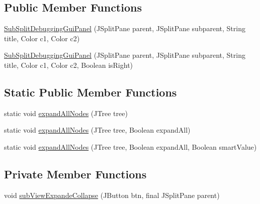 \subsection*{Public Member Functions}
\begin{DoxyCompactItemize}
\item 
\hyperlink{classit_1_1emarolab_1_1cagg_1_1debugging_1_1baseComponents_1_1customPanel_1_1SubSplitDebuggingGuiPanel_adb34980b945f0e1a777218be8d4c1d0a}{Sub\-Split\-Debugging\-Gui\-Panel} (J\-Split\-Pane parent, J\-Split\-Pane subparent, String title, Color c1, Color c2)
\item 
\hyperlink{classit_1_1emarolab_1_1cagg_1_1debugging_1_1baseComponents_1_1customPanel_1_1SubSplitDebuggingGuiPanel_a4933fbfc4f67f3e7fbb98c654fccbf55}{Sub\-Split\-Debugging\-Gui\-Panel} (J\-Split\-Pane parent, J\-Split\-Pane subparent, String title, Color c1, Color c2, Boolean is\-Right)
\end{DoxyCompactItemize}
\subsection*{Static Public Member Functions}
\begin{DoxyCompactItemize}
\item 
static void \hyperlink{classit_1_1emarolab_1_1cagg_1_1debugging_1_1baseComponents_1_1customPanel_1_1SubSplitDebuggingGuiPanel_aeec9acb40c34b799f3cbe75baf328f80}{expand\-All\-Nodes} (J\-Tree tree)
\item 
static void \hyperlink{classit_1_1emarolab_1_1cagg_1_1debugging_1_1baseComponents_1_1customPanel_1_1SubSplitDebuggingGuiPanel_a24eed65195ad04f077121d16e66fe426}{expand\-All\-Nodes} (J\-Tree tree, Boolean expand\-All)
\item 
static void \hyperlink{classit_1_1emarolab_1_1cagg_1_1debugging_1_1baseComponents_1_1customPanel_1_1SubSplitDebuggingGuiPanel_a0e0feb95b54083c6d3b2f289b4366e09}{expand\-All\-Nodes} (J\-Tree tree, Boolean expand\-All, Boolean smart\-Value)
\end{DoxyCompactItemize}
\subsection*{Private Member Functions}
\begin{DoxyCompactItemize}
\item 
void \hyperlink{classit_1_1emarolab_1_1cagg_1_1debugging_1_1baseComponents_1_1customPanel_1_1SubSplitDebuggingGuiPanel_acb2b5b5b4a834eabfe4e68606920ef54}{sub\-View\-Expande\-Collapse} (J\-Button btn, final J\-Split\-Pane parent)
\end{DoxyCompactItemize}
